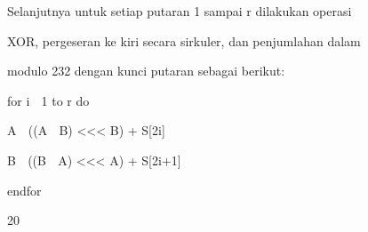 \documentclass{article}
\begin{document}

Selanjutnya untuk setiap putaran 1 sampai r dilakukan operasi 

XOR, pergeseran ke kiri secara sirkuler, dan penjumlahan dalam 

modulo 232 dengan kunci putaran sebagai berikut:


for i  1 to r do


      A  ((A  B) <<< B) + S[2i]


      B  ((B  A) <<< A) + S[2i+1]


endfor

20
\end{document}
